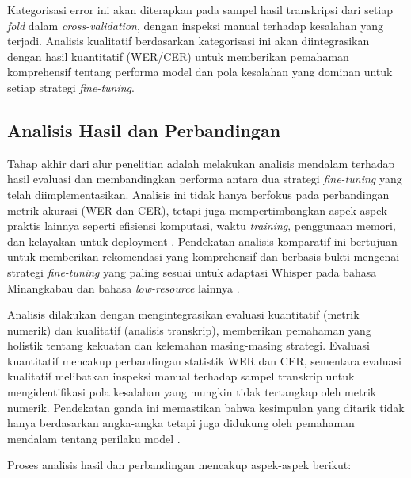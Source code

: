 Kategorisasi error ini akan diterapkan pada sampel hasil transkripsi dari setiap \textit{fold} dalam \textit{cross-validation}, dengan inspeksi manual terhadap kesalahan yang terjadi. Analisis kualitatif berdasarkan kategorisasi ini akan diintegrasikan dengan hasil kuantitatif (WER/CER) untuk memberikan pemahaman komprehensif tentang performa model dan pola kesalahan yang dominan untuk setiap strategi \textit{fine-tuning}.


\subsection{Analisis Hasil dan Perbandingan}
\label{III.Langkah9}

Tahap akhir dari alur penelitian adalah melakukan analisis mendalam terhadap hasil evaluasi dan membandingkan performa antara dua strategi \textit{fine-tuning} yang telah diimplementasikan. Analisis ini tidak hanya berfokus pada perbandingan metrik akurasi (WER dan CER), tetapi juga mempertimbangkan aspek-aspek praktis lainnya seperti efisiensi komputasi, waktu \textit{training}, penggunaan memori, dan kelayakan untuk deployment \cite{song2024lorawhisper,hu2022lora}. Pendekatan analisis komparatif ini bertujuan untuk memberikan rekomendasi yang komprehensif dan berbasis bukti mengenai strategi \textit{fine-tuning} yang paling sesuai untuk adaptasi Whisper pada bahasa Minangkabau dan bahasa \textit{low-resource} lainnya \cite{liu2024exploration,gete2025whispering}.

Analisis dilakukan dengan mengintegrasikan evaluasi kuantitatif (metrik numerik) dan kualitatif (analisis transkrip), memberikan pemahaman yang holistik tentang kekuatan dan kelemahan masing-masing strategi. Evaluasi kuantitatif mencakup perbandingan statistik WER dan CER, sementara evaluasi kualitatif melibatkan inspeksi manual terhadap sampel transkrip untuk mengidentifikasi pola kesalahan yang mungkin tidak tertangkap oleh metrik numerik. Pendekatan ganda ini memastikan bahwa kesimpulan yang ditarik tidak hanya berdasarkan angka-angka tetapi juga didukung oleh pemahaman mendalam tentang perilaku model \cite{morris2004wer}.

Proses analisis hasil dan perbandingan mencakup aspek-aspek berikut:

